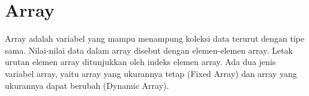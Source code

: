 \section{Array}
Array adalah variabel yang mampu menampung koleksi data terurut dengan tipe sama. 
Nilai-nilai data dalam array disebut dengan elemen-elemen array. Letak urutan elemen array ditunjukkan oleh indeks elemen array. 
Ada dua jenis variabel array, yaitu array yang ukurannya tetap (Fixed Array) dan array yang ukurannya dapat berubah (Dynamic Array).

